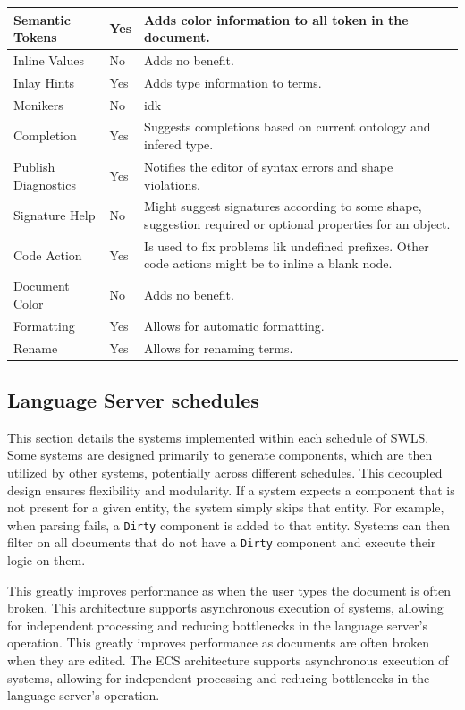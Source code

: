 \begin{table}[ht]
{{\begin{tabular}{||l l l||}
  \hline
  Semantic Tokens & Yes & Adds color information to all token in the document. \\
  \hline
  Inline Values & No & Adds no benefit.\\
  \hline
  Inlay Hints & Yes & Adds type information to terms.\\
  \hline
  Monikers & No & idk \\ 
  \hline
  Completion & Yes & Suggests completions based on current ontology and infered type. \\
  \hline
  Publish Diagnostics & Yes & Notifies the editor of syntax errors and shape violations. \\
  \hline
  Signature Help & No & Might suggest signatures according to some shape, suggestion required or optional properties for an object. \\
  \hline
  Code Action & Yes & Is used to fix problems lik undefined prefixes. Other code actions might be to inline a blank node. \\
  \hline
  Document Color & No & Adds no benefit. \\
  \hline
  Formatting & Yes & Allows for automatic formatting. \\
  \hline
  Rename & Yes & Allows for renaming terms. \\
  \hline
\end{tabular}
  }
  }
\end{table}




\subsection{Language Server schedules}

This section details the systems implemented within each schedule of SWLS.
Some systems are designed primarily to generate components, which are then utilized by other systems, potentially across different schedules.
This decoupled design ensures flexibility and modularity. 
If a system expects a component that is not present for a given entity, the system simply skips that entity.
For example, when parsing fails, a \texttt{Dirty} component is added to that entity.
Systems can then filter on all documents that do not have a \texttt{Dirty} component and execute their logic on them.

This greatly improves performance as when the user types the document is often broken.
This architecture supports asynchronous execution of systems, allowing for independent processing and reducing bottlenecks in the language server’s operation.
This greatly improves performance as documents are often broken when they are edited.
The ECS architecture supports asynchronous execution of systems, allowing for independent processing and reducing bottlenecks in the language server’s operation.

